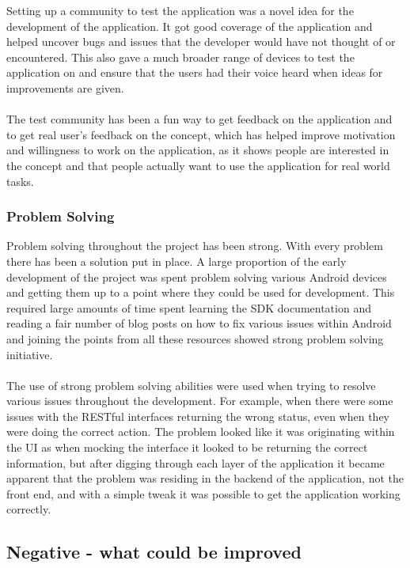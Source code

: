 Setting up a community to test the application was a novel idea for the development of the application. It got good coverage of the application and helped uncover bugs and issues that the developer would have not thought of or encountered. This also gave a much broader range of devices to test the application on and ensure that the users had their voice heard when ideas for improvements are given.\\
\\
The test community has been a fun way to get feedback on the application and to get real user's feedback on the concept, which has helped improve motivation and willingness to work on the application, as it shows people are interested in the concept and that people actually want to use the application for real world tasks.

\subsubsection{Problem Solving}

Problem solving throughout the project has been strong. With every problem there has been a solution put in place. A large proportion of the early development of the project was spent problem solving various Android devices and getting them up to a point where they could be used for development. This required large amounts of time spent learning the SDK documentation and reading a fair number of blog posts on how to fix various issues within Android and joining the points from all these resources showed strong problem solving initiative.\\
\\
The use of strong problem solving abilities were used when trying to resolve various issues throughout the development. For example, when there were some issues with the RESTful interfaces returning the wrong status, even when they were doing the correct action. The problem looked like it was originating within the UI as when mocking the interface it looked to be returning the correct information, but after digging through each layer of the application it became apparent that the problem was residing in the backend of the application, not the front end, and with a simple tweak it was possible to get the application working correctly.

\subsection{Negative - what could be improved}
\label{sec:negative_personal}

